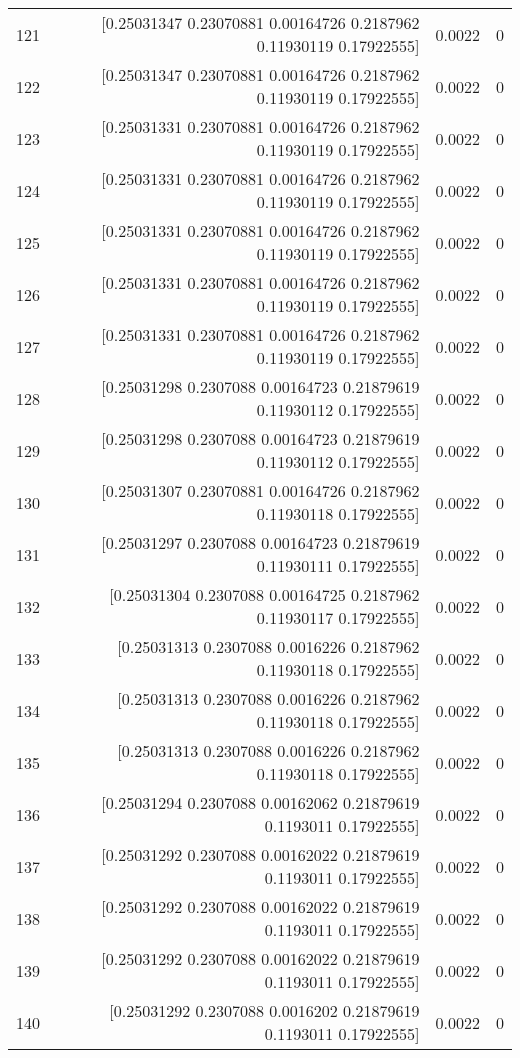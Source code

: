 \begin{longtable}{lrrr}
121 & [0.25031347 0.23070881 0.00164726 0.2187962  0.11930119 0.17922555] & 0.0022 & 0 \\
122 & [0.25031347 0.23070881 0.00164726 0.2187962  0.11930119 0.17922555] & 0.0022 & 0 \\
123 & [0.25031331 0.23070881 0.00164726 0.2187962  0.11930119 0.17922555] & 0.0022 & 0 \\
124 & [0.25031331 0.23070881 0.00164726 0.2187962  0.11930119 0.17922555] & 0.0022 & 0 \\
125 & [0.25031331 0.23070881 0.00164726 0.2187962  0.11930119 0.17922555] & 0.0022 & 0 \\
126 & [0.25031331 0.23070881 0.00164726 0.2187962  0.11930119 0.17922555] & 0.0022 & 0 \\
127 & [0.25031331 0.23070881 0.00164726 0.2187962  0.11930119 0.17922555] & 0.0022 & 0 \\
128 & [0.25031298 0.2307088  0.00164723 0.21879619 0.11930112 0.17922555] & 0.0022 & 0 \\
129 & [0.25031298 0.2307088  0.00164723 0.21879619 0.11930112 0.17922555] & 0.0022 & 0 \\
130 & [0.25031307 0.23070881 0.00164726 0.2187962  0.11930118 0.17922555] & 0.0022 & 0 \\
131 & [0.25031297 0.2307088  0.00164723 0.21879619 0.11930111 0.17922555] & 0.0022 & 0 \\
132 & [0.25031304 0.2307088  0.00164725 0.2187962  0.11930117 0.17922555] & 0.0022 & 0 \\
133 & [0.25031313 0.2307088  0.0016226  0.2187962  0.11930118 0.17922555] & 0.0022 & 0 \\
134 & [0.25031313 0.2307088  0.0016226  0.2187962  0.11930118 0.17922555] & 0.0022 & 0 \\
135 & [0.25031313 0.2307088  0.0016226  0.2187962  0.11930118 0.17922555] & 0.0022 & 0 \\
136 & [0.25031294 0.2307088  0.00162062 0.21879619 0.1193011  0.17922555] & 0.0022 & 0 \\
137 & [0.25031292 0.2307088  0.00162022 0.21879619 0.1193011  0.17922555] & 0.0022 & 0 \\
138 & [0.25031292 0.2307088  0.00162022 0.21879619 0.1193011  0.17922555] & 0.0022 & 0 \\
139 & [0.25031292 0.2307088  0.00162022 0.21879619 0.1193011  0.17922555] & 0.0022 & 0 \\
140 & [0.25031292 0.2307088  0.0016202  0.21879619 0.1193011  0.17922555] & 0.0022 & 0 \\

\end{longtable}
